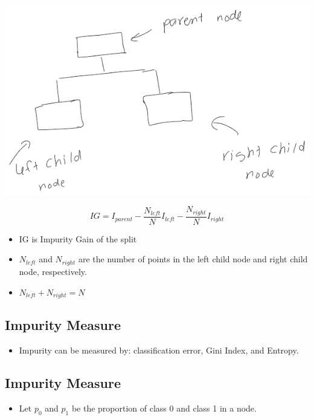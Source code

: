\documentclass[
]{article}
\providecommand{\tightlist}{%
  \setlength{\itemsep}{0pt}\setlength{\parskip}{0pt}}
\begin{document}
\includegraphics{images/parent_child.png}

\[
IG = I_{parent} - \frac{N_{left}}{N}I_{left}-\frac{N_{right}}{N}I_{right}
\]

\begin{itemize}
\tightlist
\item
  IG is Impurity Gain of the split
\item
  \(N_{left}\) and \(N_{right}\) are the number of points in the left
  child node and right child node, respectively.
\item
  \(N_{left}+N_{right}=N\)
\end{itemize}

\hypertarget{impurity-measure-2}{%
\subsection{Impurity Measure}\label{impurity-measure-2}}

\begin{itemize}
\tightlist
\item
  Impurity can be measured by: classification error, Gini Index, and
  Entropy.
\end{itemize}

\hypertarget{impurity-measure-3}{%
\subsection{Impurity Measure}\label{impurity-measure-3}}

\begin{itemize}
\tightlist
\item
  Let \(p_0\) and \(p_1\) be the proportion of class 0 and class 1 in a
  node.
\end{itemize}
\end{document}
